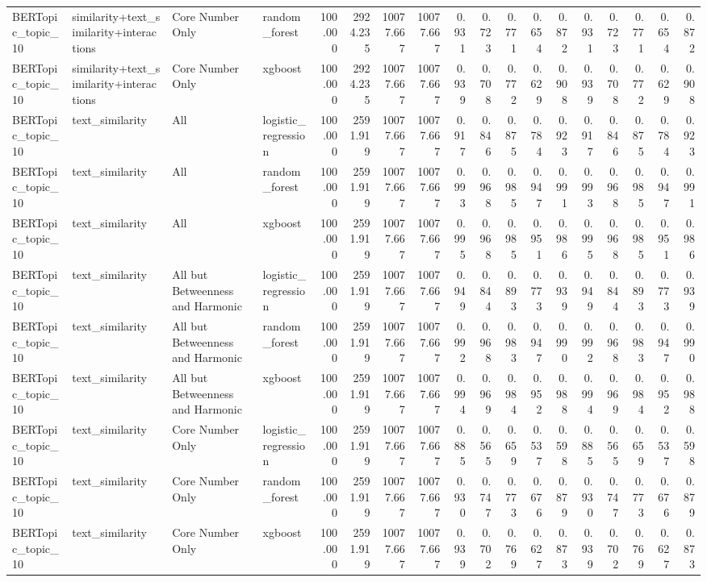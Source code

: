 \begin{tabular}{llllrrrrrrrrrrrrrr}
BERTopic_topic_10 & similarity+text_similarity+interactions & Core Number Only & random_forest & 100.000 & 2924.235 & 10077.667 & 10077.667 & 0.931 & 0.723 & 0.771 & 0.654 & 0.872 & 0.931 & 0.723 & 0.771 & 0.654 & 0.872 \\
BERTopic_topic_10 & similarity+text_similarity+interactions & Core Number Only & xgboost & 100.000 & 2924.235 & 10077.667 & 10077.667 & 0.939 & 0.708 & 0.772 & 0.629 & 0.908 & 0.939 & 0.708 & 0.772 & 0.629 & 0.908 \\
BERTopic_topic_10 & text_similarity & All & logistic_regression & 100.000 & 2591.919 & 10077.667 & 10077.667 & 0.917 & 0.846 & 0.875 & 0.784 & 0.923 & 0.917 & 0.846 & 0.875 & 0.784 & 0.923 \\
BERTopic_topic_10 & text_similarity & All & random_forest & 100.000 & 2591.919 & 10077.667 & 10077.667 & 0.993 & 0.968 & 0.985 & 0.947 & 0.991 & 0.993 & 0.968 & 0.985 & 0.947 & 0.991 \\
BERTopic_topic_10 & text_similarity & All & xgboost & 100.000 & 2591.919 & 10077.667 & 10077.667 & 0.995 & 0.968 & 0.985 & 0.951 & 0.986 & 0.995 & 0.968 & 0.985 & 0.951 & 0.986 \\
BERTopic_topic_10 & text_similarity & All but Betweenness and Harmonic & logistic_regression & 100.000 & 2591.919 & 10077.667 & 10077.667 & 0.949 & 0.844 & 0.893 & 0.773 & 0.939 & 0.949 & 0.844 & 0.893 & 0.773 & 0.939 \\
BERTopic_topic_10 & text_similarity & All but Betweenness and Harmonic & random_forest & 100.000 & 2591.919 & 10077.667 & 10077.667 & 0.992 & 0.968 & 0.983 & 0.947 & 0.990 & 0.992 & 0.968 & 0.983 & 0.947 & 0.990 \\
BERTopic_topic_10 & text_similarity & All but Betweenness and Harmonic & xgboost & 100.000 & 2591.919 & 10077.667 & 10077.667 & 0.994 & 0.969 & 0.984 & 0.952 & 0.988 & 0.994 & 0.969 & 0.984 & 0.952 & 0.988 \\
BERTopic_topic_10 & text_similarity & Core Number Only & logistic_regression & 100.000 & 2591.919 & 10077.667 & 10077.667 & 0.885 & 0.565 & 0.659 & 0.537 & 0.598 & 0.885 & 0.565 & 0.659 & 0.537 & 0.598 \\
BERTopic_topic_10 & text_similarity & Core Number Only & random_forest & 100.000 & 2591.919 & 10077.667 & 10077.667 & 0.930 & 0.747 & 0.773 & 0.676 & 0.879 & 0.930 & 0.747 & 0.773 & 0.676 & 0.879 \\
BERTopic_topic_10 & text_similarity & Core Number Only & xgboost & 100.000 & 2591.919 & 10077.667 & 10077.667 & 0.939 & 0.702 & 0.769 & 0.627 & 0.873 & 0.939 & 0.702 & 0.769 & 0.627 & 0.873 \\

\end{tabular}
